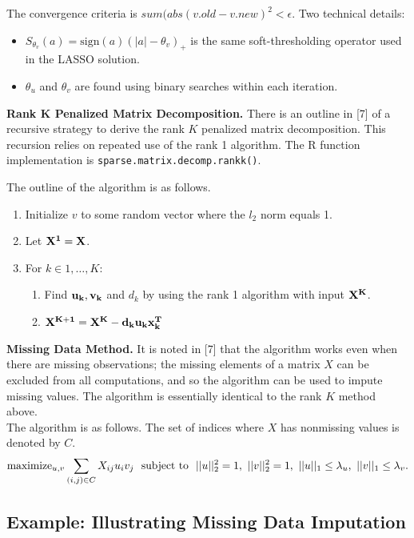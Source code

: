 \documentclass{article}
\begin{document}
The convergence criteria is $sum(abs(v.old - v.new)^2 < \epsilon$.  Two technical details:

\begin{itemize}
	\item $S_{\theta_v}(a) = \text{sign}(a)(|a| - \theta_v)_+$ is the same soft-thresholding operator used in the LASSO solution.
	\item $\theta_u$ and $\theta_v$ are found using binary searches within each iteration.\\
\end{itemize}


\textbf{Rank K Penalized Matrix Decomposition.} There is an outline in [7] of a recursive strategy to derive the rank $K$ penalized matrix decomposition.  This recursion relies on repeated use of the rank 1 algorithm. The R function implementation is {\tt sparse.matrix.decomp.rankk()}.

The outline of the algorithm is as follows.

\begin{enumerate}
	\item Initialize $v$ to some random vector where the $l_2$ norm equals 1.
	\item Let $\bf{X^1} = \bf{X}$.
	\item For $k \in {1,\dots,K}$:
	\begin{enumerate}
		\item Find $\bf{u_k}, \bf{v_k}$ and $d_k$ by using the rank 1 algorithm with input $\bf{X^K}$.
		\item $\bf{X^{K+1}} = \bf{X^K} - d_k \bf{u_k x_k^T}$\\
	\end{enumerate}
\end{enumerate}

\textbf{Missing Data Method.} It is noted in [7] that the algorithm works even when there are missing observations; the missing elements of a matrix $X$ can be excluded from all computations, and so the algorithm can be used to impute missing values.  The algorithm is essentially identical to the rank $K$ method above.  \\

The algorithm is as follows. The set of indices where $X$ has nonmissing values is denoted by $C$.
$$
	\text{maximize}_{u,v} \sum_{(i,j) \in C} X_{ij}u_i v_j\mskip12mu\hbox{subject to}\mskip12mu ||u||_2^2 = 1,\ ||v||_2^2 = 1,\ ||u||_1 \leq \lambda_u,\ ||v||_1 \leq \lambda_v.
$$

\subsection{Example: Illustrating Missing Data Imputation}
\end{document}
